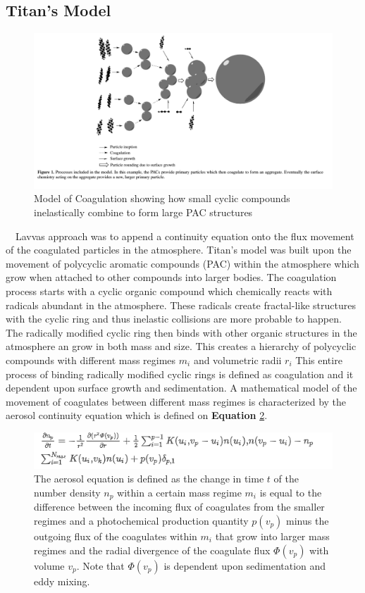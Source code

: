 \documentclass[useAMS,natbib]{mn2e}
\begin{document}
\subsection{Titan's Model}
\begin{figure}
\includegraphics[scale = 0.3]{coagulation}
\caption{Model of Coagulation showing how small cyclic compounds inelastically combine to form large PAC structures}
\label{coag}
\end{figure}
\indent~~Lavvas approach was to append a continuity equation onto the flux movement of the coagulated particles in the atmosphere. Titan's model was built upon the movement of polycyclic aromatic compounds (PAC) within the atmosphere which grow when attached to other compounds into larger bodies. The coagulation process starts with a cyclic organic compound which chemically reacts with radicals abundant in the atmosphere. These radicals create fractal-like structures with the cyclic ring and thus inelastic collisions are more probable to happen. The radically modified cyclic ring then binds with other organic structures in the atmosphere an grow in both mass and size. This creates a hierarchy of polycyclic compounds with different mass regimes $m_i$ and volumetric radii $r_i$ This entire process of binding radically modified cyclic rings is defined as coagulation and it dependent upon surface growth and sedimentation. A mathematical model of the movement of coagulates between different mass regimes is characterized by the aerosol continuity equation which is defined on \textbf{Equation} \ref{cont}.
\begin{figure}
\includegraphics[scale = 0.6]{aerosel_cont}
\caption{The aerosol equation is defined as the change in time $t$ of the number density $n_p$ within a certain mass regime $m_i$ is equal to the difference between the incoming flux of coagulates from the smaller regimes and a photochemical production quantity $p(v_p)$ minus the outgoing flux of the coagulates within $m_i$ that grow into larger mass regimes and the radial divergence of the coagulate flux $\Phi(v_p)$ with volume $v_p$. Note that $\Phi(v_p)$ is dependent upon sedimentation and eddy mixing.}
\label{cont}
\end{figure}
\end{document}
